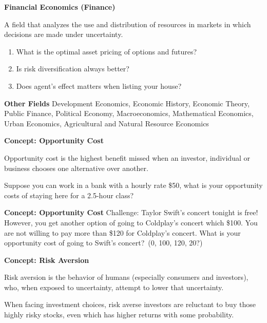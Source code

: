 \documentclass{beamer}
\let\olditem=\item%
\renewcommand{\item}{\olditem \justifying}%
\begin{document}
\begin{frame}{\bf Financial Economics (Finance)}
\begin{definition}
	A field that analyzes the use and distribution of resources in markets in which decisions are made under uncertainty. 
\end{definition}
\begin{enumerate}
	\item What is the optimal asset pricing of options and futures?
	\item Is risk diversification always better?
	\item Does agent's effect matters when listing your house?
\end{enumerate}
\end{frame}
\begin{frame}{\bf Other Fields}
Development Economics, Economic History, Economic Theory, Public Finance, Political Economy, Macroeconomics, Mathematical Economics, Urban Economics, Agricultural and Natural Resource Economics
\end{frame}

\begin{frame}{\bf Concept: Opportunity Cost}
\begin{definition}
Opportunity cost is the highest benefit missed when an investor, individual or business chooses one alternative over another.
\end{definition}
\begin{example}
Suppose you can work in a bank with a hourly rate \$50, what is your opportunity costs of staying here for a 2.5-hour class?
\end{example}
\end{frame}

\begin{frame}{\bf Concept: Opportunity Cost}
Challenge: Taylor Swift's concert tonight is free! However, you get another option of going to Coldplay's concert which \$100. You are not willing to pay more than \$120 for Coldplay's concert. What is your opportunity cost of going to Swift's concert?~(0, 100, 120, 20?)
\end{frame}

\begin{frame}{\bf Concept: Risk Aversion}
\begin{definition}
Risk aversion is the behavior of humans (especially consumers and investors), who, when exposed to uncertainty, attempt to lower that uncertainty.
\end{definition}
\begin{example}
When facing investment choices, risk averse investors are reluctant to buy those highly risky stocks, even which has higher returns with some probability.
\end{example}
\end{frame}
\end{document}
